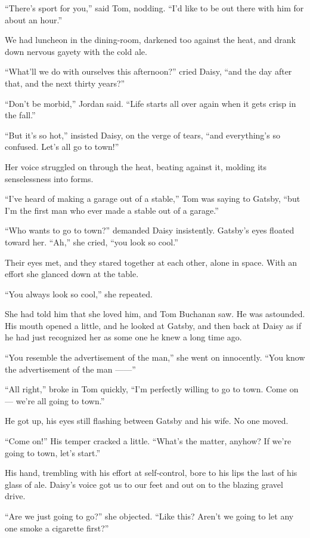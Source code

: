 \documentclass{znotebook}
\begin{document}
``There's sport for you,'' said Tom, nodding. ``I'd like to be out there with him for about an hour.''

We had luncheon in the dining-room, darkened too against the heat, and drank down nervous gayety with the cold ale.

``What'll we do with ourselves this afternoon?'' cried Daisy, ``and the day after that, and the next thirty years?''

``Don't be morbid,'' Jordan said. ``Life starts all over again when it gets crisp in the fall.''

``But it's so hot,'' insisted Daisy, on the verge of tears, ``and everything's so confused. Let's all go to town!''

Her voice struggled on through the heat, beating against it, molding its senselessness into forms.

``I've heard of making a garage out of a stable,'' Tom was saying to Gatsby, ``but I'm the first man who ever made a stable out of a garage.''

``Who wants to go to town?'' demanded Daisy insistently. Gatsby's eyes floated toward her. ``Ah,'' she cried, ``you look so cool.''

Their eyes met, and they stared together at each other, alone in space. With an effort she glanced down at the table.

``You always look so cool,'' she repeated.

She had told him that she loved him, and Tom Buchanan saw. He was astounded. His mouth opened a little, and he looked at Gatsby, and then back at Daisy as if he had just recognized her as some one he knew a long time ago.

``You resemble the advertisement of the man,'' she went on innocently. ``You know the advertisement of the man ——''

``All right,'' broke in Tom quickly, ``I'm perfectly willing to go to town. Come on — we're all going to town.''

He got up, his eyes still flashing between Gatsby and his wife. No one moved.

``Come on!'' His temper cracked a little. ``What's the matter, anyhow? If we're going to town, let's start.''

His hand, trembling with his effort at self-control, bore to his lips the last of his glass of ale. Daisy's voice got us to our feet and out on to the blazing gravel drive.

``Are we just going to go?'' she objected. ``Like this? Aren't we going to let any one smoke a cigarette first?''
\end{document}
